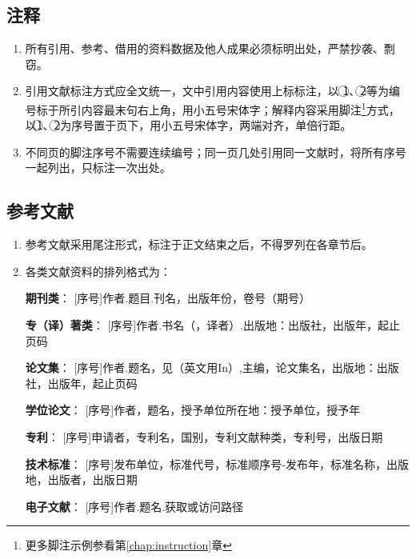 \subsection{注释}

\begin{enumerate}[label=\arabic*)]
	\item 所有引用、参考、借用的资料数据及他人成果必须标明出处，严禁抄袭、剽窃。
	
	\item 引用文献标注方式应全文统一，文中引用内容使用上标标注，以 \textcircled{1}、\textcircled{2}等为编号标于所引内容最末句右上角，用小五号宋体字；解释内容采用脚注\footnote{更多脚注示例参看第\ref{chap:instruction}章}方式，以\textcircled{1}、\textcircled{2}为序号置于页下，用小五号宋体字，两端对齐，单倍行距。
	
	\item 不同页的脚注序号不需要连续编号；同一页几处引用同一文献时，将所有序号一起列出，只标注一次出处。
	
\end{enumerate}

\subsection{参考文献}

\begin{enumerate}[label=\arabic*)]
	\item 参考文献采用尾注形式，标注于正文结束之后，不得罗列在各章节后。
	
	\item 各类文献资料的排列格式为：
	
	{\bfseries 期刊类}：
	[序号]作者.题目.刊名，出版年份，卷号（期号）
	
	{\bfseries 专（译）著类}：
	[序号]作者.书名（，译者）.出版地：出版社，出版年，起止页码
	
	{\bfseries 论文集}：
	[序号]作者.题名，见（英文用In）,主编，论文集名，出版地：出版社，出版年，起止页码
	
	{\bfseries 学位论文}：
	[序号]作者，题名，授予单位所在地：授予单位，授予年
	
	{\bfseries 专利}：
	[序号]申请者，专利名，国别，专利文献种类，专利号，出版日期
	
	{\bfseries 技术标准}：
	[序号]发布单位，标准代号，标准顺序号-发布年，标准名称，出版地，出版者，出版日期
	
	{\bfseries 电子文献}：
	[序号]作者.题名.获取或访问路径
	
\end{enumerate}

